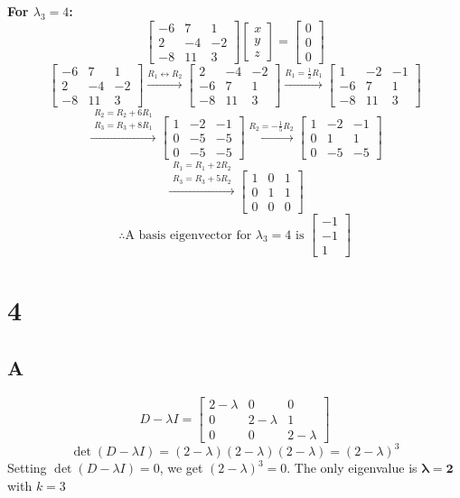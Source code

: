 \documentclass{article}
\newcommand{\mat}[1]{\begin{bmatrix} #1 \end{bmatrix}}
\newcommand{\vect}[1]{\begin{bmatrix} #1 \end{bmatrix}}
\begin{document}
\textbf{For $\lambda_3 = 4$:}
\[
	\mat{ -6 & 7 & 1 \\ 2 & -4 & -2 \\ -8 & 11 & 3 } \vect{x \\ y \\ z} = \vect{0 \\ 0 \\ 0}
\]
\[
	\mat{ -6 & 7 & 1 \\ 2 & -4 & -2 \\ -8 & 11 & 3 }
	\xrightarrow{R_1 \leftrightarrow R_2}
	\mat{ 2 & -4 & -2 \\ -6 & 7 & 1 \\ -8 & 11 & 3 }
	\xrightarrow{R_1 = \frac{1}{2}R_1}
	\mat{ 1 & -2 & -1 \\ -6 & 7 & 1 \\ -8 & 11 & 3 }
\]
\[
	\xrightarrow{\substack{R_2 = R_2 + 6R_1 \\ R_3 = R_3 + 8R_1}}
	\mat{ 1 & -2 & -1 \\ 0 & -5 & -5 \\ 0 & -5 & -5 }
	\xrightarrow{R_2 = -\frac{1}{5}R_2}
	\mat{ 1 & -2 & -1 \\ 0 & 1 & 1 \\ 0 & -5 & -5 }
\]
\[
	\xrightarrow{\substack{R_1 = R_1 + 2R_2 \\ R_3 = R_3 + 5R_2}}
	\mat{ 1 & 0 & 1 \\ 0 & 1 & 1 \\ 0 & 0 & 0 }
\]
\[
	\therefore \text{A basis eigenvector for } \lambda_3 = 4 \text{ is } \vect{-1 \\ -1 \\ 1}
\]


\section*{4}
\subsection*{A}

\[
	D - \lambda I = \mat{ 2 - \lambda & 0 & 0 \\ 0 & 2 - \lambda & 1 \\ 0 & 0 & 2 - \lambda }
\]
\[
	\det(D - \lambda I) = (2 - \lambda)(2 - \lambda)(2 - \lambda) = (2 - \lambda)^3
\]
Setting $\det(D - \lambda I) = 0$, we get $(2 - \lambda)^3 = 0$.
The only eigenvalue is $\mathbf{\lambda = 2}$ with \(k=3\)
\end{document}
